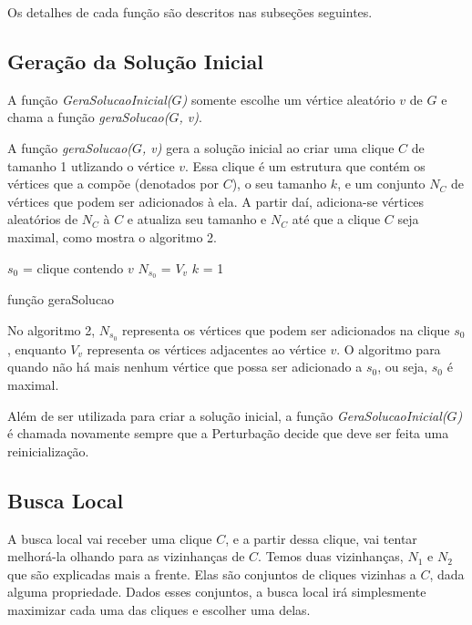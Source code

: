 \documentclass{article}
\begin{document}
Os detalhes de cada função são descritos nas subseções seguintes. 

\subsection{Geração da Solução Inicial}

A função \textit{GeraSolucaoInicial($G$)} somente escolhe um vértice aleatório $v$ de $G$ e chama a função \textit{geraSolucao($G$, v)}.\par

A função \textit{geraSolucao($G$, v)} gera a solução inicial ao criar uma clique $C$ de tamanho 1 utlizando o vértice $v$. Essa clique é um estrutura que contém os vértices que a compõe (denotados por $C$), o seu tamanho $k$, e um conjunto $N_C$ de vértices que podem ser adicionados à ela. A partir daí, adiciona-se vértices aleatórios de $N_C$ à $C$ e atualiza seu tamanho e $N_C$ até que a clique $C$ seja maximal, como mostra o algoritmo 2.\par

\begin{algorithm}
 $s_0$ = clique contendo $v$\;
 $N_{s_0}$ = $V_v$\;
 $k$ = 1\;
 \caption{função geraSolucao}
\end{algorithm}

No algoritmo 2, $N_{s_0}$ representa os vértices que podem ser adicionados na clique $s_0$, enquanto $V_v$ representa os vértices adjacentes ao vértice $v$. O algoritmo para quando não há mais nenhum vértice que possa ser adicionado a $s_0$, ou seja, $s_0$ é maximal.\par

Além de ser utilizada para criar a solução inicial, a função \textit{GeraSolucaoInicial($G$)} é chamada novamente sempre que a Perturbação decide que deve ser feita uma reinicialização.

\subsection{Busca Local}

A busca local vai receber uma clique $C$, e a partir dessa clique, vai tentar melhorá-la olhando para as vizinhanças de $C$. Temos duas vizinhanças, $N_1$ e $N_2$ que são explicadas mais a frente. Elas são conjuntos de cliques vizinhas a $C$, dada alguma propriedade. Dados esses conjuntos, a busca local irá simplesmente maximizar cada uma das cliques e escolher uma delas.\par
\end{document}
